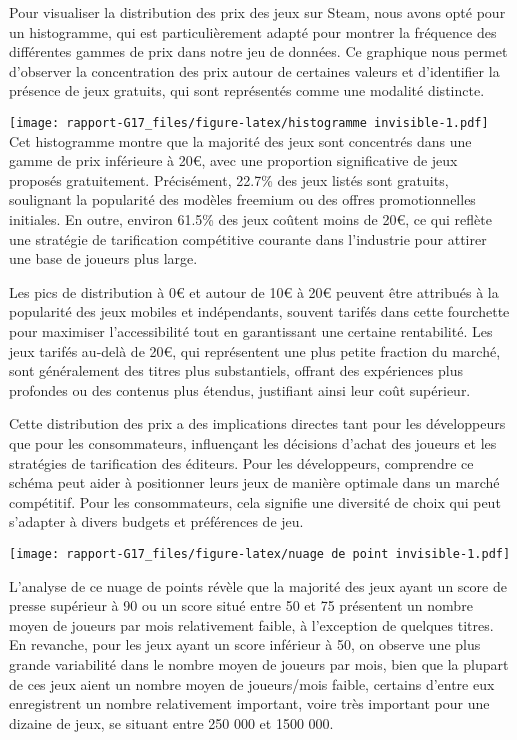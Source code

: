 \documentclass[mstat,12pt]{unswthesis}
\begin{document}
Pour visualiser la distribution des prix des jeux sur Steam, nous avons
opté pour un histogramme, qui est particulièrement adapté pour montrer
la fréquence des différentes gammes de prix dans notre jeu de données.
Ce graphique nous permet d'observer la concentration des prix autour de
certaines valeurs et d'identifier la présence de jeux gratuits, qui sont
représentés comme une modalité distincte.

\texttt{[image: rapport-G17\_files/figure-latex/histogramme invisible-1.pdf]}
Cet histogramme montre que la majorité des jeux sont concentrés dans une
gamme de prix inférieure à 20€, avec une proportion significative de
jeux proposés gratuitement. Précisément, 22.7\% des jeux listés sont
gratuits, soulignant la popularité des modèles freemium ou des offres
promotionnelles initiales. En outre, environ 61.5\% des jeux coûtent
moins de 20€, ce qui reflète une stratégie de tarification compétitive
courante dans l'industrie pour attirer une base de joueurs plus large.

Les pics de distribution à 0€ et autour de 10€ à 20€ peuvent être
attribués à la popularité des jeux mobiles et indépendants, souvent
tarifés dans cette fourchette pour maximiser l'accessibilité tout en
garantissant une certaine rentabilité. Les jeux tarifés au-delà de 20€,
qui représentent une plus petite fraction du marché, sont généralement
des titres plus substantiels, offrant des expériences plus profondes ou
des contenus plus étendus, justifiant ainsi leur coût supérieur.

Cette distribution des prix a des implications directes tant pour les
développeurs que pour les consommateurs, influençant les décisions
d'achat des joueurs et les stratégies de tarification des éditeurs. Pour
les développeurs, comprendre ce schéma peut aider à positionner leurs
jeux de manière optimale dans un marché compétitif. Pour les
consommateurs, cela signifie une diversité de choix qui peut s'adapter à
divers budgets et préférences de jeu.

\newpage

\texttt{[image: rapport-G17\_files/figure-latex/nuage de point invisible-1.pdf]}
\bigskip

L'analyse de ce nuage de points révèle que la majorité des jeux ayant un
score de presse supérieur à 90 ou un score situé entre 50 et 75
présentent un nombre moyen de joueurs par mois relativement faible, à
l'exception de quelques titres. En revanche, pour les jeux ayant un
score inférieur à 50, on observe une plus grande variabilité dans le
nombre moyen de joueurs par mois, bien que la plupart de ces jeux aient
un nombre moyen de joueurs/mois faible, certains d'entre eux
enregistrent un nombre relativement important, voire très important pour
une dizaine de jeux, se situant entre 250 000 et 1500 000.
\end{document}
